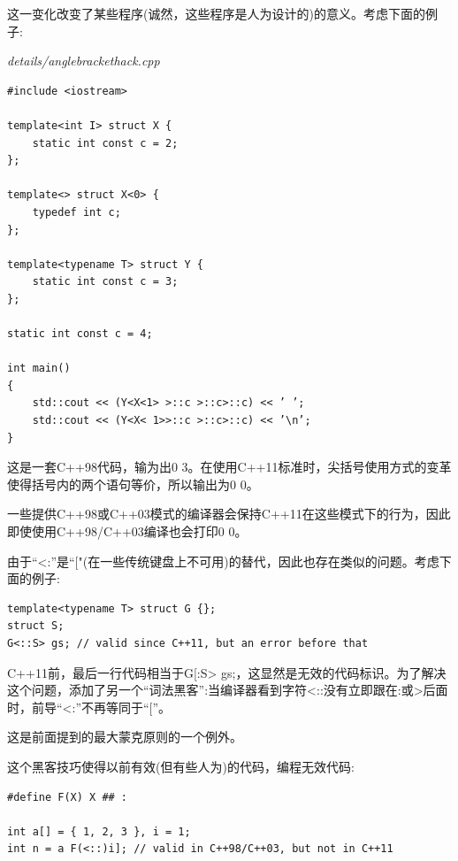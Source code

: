 这一变化改变了某些程序(诚然，这些程序是人为设计的)的意义。考虑下面的例子:

\noindent
\textit{details/anglebrackethack.cpp}
\begin{lstlisting}[style=styleCXX]
#include <iostream>

template<int I> struct X {
	static int const c = 2;
};

template<> struct X<0> {
	typedef int c;
};

template<typename T> struct Y {
	static int const c = 3;
};

static int const c = 4;

int main()
{
	std::cout << (Y<X<1> >::c >::c>::c) << ’ ’;
	std::cout << (Y<X< 1>>::c >::c>::c) << ’\n’;
}
\end{lstlisting}

这是一套C++98代码，输为出0 3。在使用C++11标准时，尖括号使用方式的变革使得括号内的两个语句等价，所以输出为0 0。

\begin{tcolorbox}[colback=webgreen!5!white,colframe=webgreen!75!black]
\hspace*{0.75cm}一些提供C++98或C++03模式的编译器会保持C++11在这些模式下的行为，因此即使使用C++98/C++03编译也会打印0 0。
\end{tcolorbox}

由于“<:”是“["(在一些传统键盘上不可用)的替代，因此也存在类似的问题。考虑下面的例子:

\begin{lstlisting}[style=styleCXX]
template<typename T> struct G {};
struct S;
G<::S> gs; // valid since C++11, but an error before that
\end{lstlisting}

C++11前，最后一行代码相当于G[:S> gs;，这显然是无效的代码标识。为了解决这个问题，添加了另一个“词法黑客”:当编译器看到字符<::没有立即跟在:或>后面时，前导“<:”不再等同于“[”。

\begin{tcolorbox}[colback=webgreen!5!white,colframe=webgreen!75!black]
\hspace*{0.75cm}这是前面提到的最大蒙克原则的一个例外。
\end{tcolorbox}

这个黑客技巧使得以前有效(但有些人为)的代码，编程无效代码:

\begin{lstlisting}[style=styleCXX]
#define F(X) X ## :

int a[] = { 1, 2, 3 }, i = 1;
int n = a F(<::)i]; // valid in C++98/C++03, but not in C++11
\end{lstlisting}

